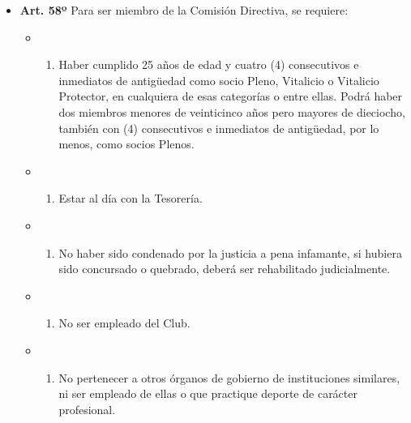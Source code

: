 \documentclass[]{book}
\providecommand{\tightlist}{%
  \setlength{\itemsep}{0pt}\setlength{\parskip}{0pt}}
\begin{document}
\begin{itemize}
\tightlist
\item
  \textbf{Art. 58º}
  Para ser miembro de la Comisión Directiva, se requiere:

  \begin{itemize}
  \item
    \begin{enumerate}
    \def\labelenumi{\alph{enumi})}
    \tightlist
    \item
      Haber cumplido 25 años de edad y cuatro (4) consecutivos e inmediatos de antigüedad como socio Pleno, Vitalicio o Vitalicio Protector, en cualquiera de esas categorías o entre ellas. Podrá haber dos miembros menores de veinticinco años pero mayores de dieciocho, también con (4) consecutivos e inmediatos de antigüedad, por lo menos, como socios Plenos.
    \end{enumerate}
  \item
    \begin{enumerate}
    \def\labelenumi{\alph{enumi})}
    \setcounter{enumi}{1}
    \tightlist
    \item
      Estar al día con la Tesorería.
    \end{enumerate}
  \item
    \begin{enumerate}
    \def\labelenumi{\alph{enumi})}
    \setcounter{enumi}{2}
    \tightlist
    \item
      No haber sido condenado por la justicia a pena infamante, si hubiera sido concursado o quebrado, deberá ser rehabilitado judicialmente.
    \end{enumerate}
  \item
    \begin{enumerate}
    \def\labelenumi{\alph{enumi})}
    \setcounter{enumi}{3}
    \tightlist
    \item
      No ser empleado del Club.
    \end{enumerate}
  \item
    \begin{enumerate}
    \def\labelenumi{\alph{enumi})}
    \setcounter{enumi}{4}
    \tightlist
    \item
      No pertenecer a otros órganos de gobierno de instituciones similares, ni ser empleado de ellas o que practique deporte de carácter profesional.
    \end{enumerate}
  \end{itemize}
\end{itemize}
\end{document}
